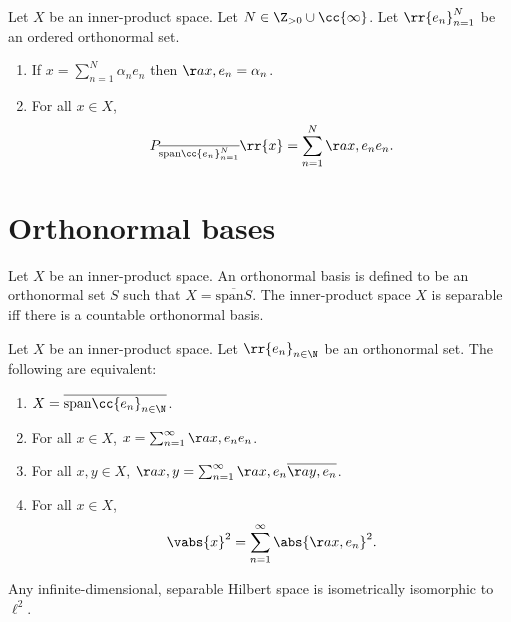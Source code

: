 \documentclass{article}
\begin{document}
\begin{theorem}
  Let $X$ be an inner-product space. Let $N\in\Z_{>0}\cup\cc{\infty}$. Let $\rr{e_n}_{n=1}^N$
  be an ordered orthonormal set.
  \begin{enumerate}
    \item If $x=\sum_{n=1}^{N} \alpha_n e_n$ then $\aa{x,e_n}=\alpha_n$.
    \item For all $x\in X$, \begin{align*}
        P_{\overline{\text{span}\cc{e_n}_{n=1}^N}}\rr{x}=\sum_{n=1}^{N} \aa{x,e_n}e_n.
      \end{align*}
  \end{enumerate}
\end{theorem}

\section{Orthonormal bases}\label{sec:orthonormal-bases}

\begin{definition}\label{def:orthonormal-basis}
  Let $X$ be an inner-product space. An orthonormal basis is defined to be an orthonormal
  set $S$ such that $X=\overline{\text{span}S}$. The inner-product space $X$ is separable
  iff there is a countable orthonormal basis.
\end{definition}

\begin{theorem}
  Let $X$ be an inner-product space. Let $\rr{e_n}_{n\in\N}$ be an orthonormal set.
  The following are equivalent:
  \begin{enumerate}
    \item $X=\overline{\text{span}\cc{e_n}_{n\in\N}}$.
    \item For all $x\in X$, $x=\sum_{n=1}^{\infty} \aa{x,e_n}e_n$.
    \item For all $x,y\in X$, $\aa{x,y}=\sum_{n=1}^{\infty} \aa{x,e_n}\overline{\aa{y,e_n}}$.
    \item For all $x\in X$, \begin{align*}
      \vabs{x}^2 = \sum_{n=1}^{\infty} \abs{\aa{x,e_n}}^2.
    \end{align*}
  \end{enumerate}
\end{theorem}

\begin{corollary}
  Any infinite-dimensional, separable Hilbert space is isometrically isomorphic to $\ell^2$.
\end{corollary}
\end{document}
